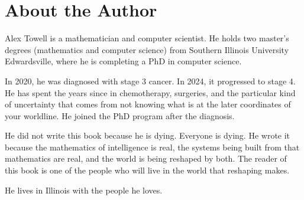 \chapter*{About the Author}

Alex Towell is a mathematician and computer scientist. He holds two master's degrees (mathematics and computer science) from Southern Illinois University Edwardsville, where he is completing a PhD in computer science.

In 2020, he was diagnosed with stage 3 cancer. In 2024, it progressed to stage 4. He has spent the years since in chemotherapy, surgeries, and the particular kind of uncertainty that comes from not knowing what is at the later coordinates of your worldline. He joined the PhD program after the diagnosis.

He did not write this book because he is dying. Everyone is dying. He wrote it because the mathematics of intelligence is real, the systems being built from that mathematics are real, and the world is being reshaped by both. The reader of this book is one of the people who will live in the world that reshaping makes.

He lives in Illinois with the people he loves.
